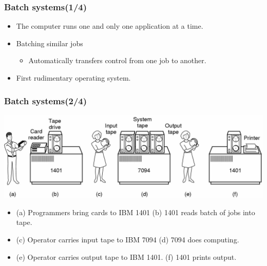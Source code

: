\documentclass[CJKutf8,xcolor=pdftex,dvipsnames,table]{beamer}
\begin{document}
\begin{CJK*}{UTF8}{song}
  \begin{frame}
    \frametitle{Batch systems(1/4)} \pause
	  \begin{itemize}
	  \item{The computer runs one and only one application at a time.} \pause
	  \item{Batching similar jobs} \pause
	    \begin{itemize}
	    \item{Automatically transfers control from one job to another.} \pause
	    \end{itemize}
	  \item{First rudimentary operating system.}
	  \end{itemize}
  \end{frame}

  \begin{frame}
    \frametitle{Batch systems(2/4)} \pause
	  \begin{center}
	    \includegraphics[scale=0.4]{mosv2f1-2} \pause
	  \end{center}
	  \begin{itemize}
	  \item{\scriptsize{(a) Programmers bring cards to IBM 1401} \pause \scriptsize{(b) 1401 reads batch of jobs into tape.}} \pause
	  \item{\scriptsize{(c) Operator carries input tape to IBM 7094} \pause  \scriptsize{(d) 7094 does computing.}} \pause
	  \item{\scriptsize{(e) Operator carries output tape to IBM 1401.} \pause \scriptsize{(f) 1401 prints output.}}
	  \end{itemize}
  \end{frame}


\end{CJK*}
\end{document}
